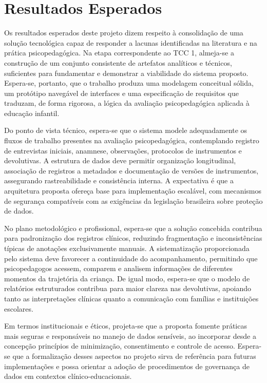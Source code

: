 \chapter[Resultados Esperados]{Resultados Esperados}\label{capitulo6}

Os resultados esperados deste projeto dizem respeito à consolidação de uma solução tecnológica capaz de responder a lacunas identificadas na literatura e na prática psicopedagógica. Na etapa correspondente ao TCC 1, almeja-se a construção de um conjunto consistente de artefatos analíticos e técnicos, suficientes para fundamentar e demonstrar a viabilidade do sistema proposto. Espera-se, portanto, que o trabalho produza uma modelagem conceitual sólida, um protótipo navegável de interfaces e uma especificação de requisitos que traduzam, de forma rigorosa, a lógica da avaliação psicopedagógica aplicada à educação infantil.

Do ponto de vista técnico, espera-se que o sistema modele adequadamente os fluxos de trabalho presentes na avaliação psicopedagógica, contemplando registro de entrevistas iniciais, anamnese, observações, protocolos de instrumentos e devolutivas. A estrutura de dados deve permitir organização longitudinal, associação de registros a metadados e documentação de versões de instrumentos, assegurando rastreabilidade e consistência interna. A expectativa é que a arquitetura proposta ofereça base para implementação escalável, com mecanismos de segurança compatíveis com as exigências da legislação brasileira sobre proteção de dados.

No plano metodológico e profissional, espera-se que a solução concebida contribua para padronização dos registros clínicos, reduzindo fragmentação e inconsistências típicas de anotações exclusivamente manuais. A sistematização proporcionada pelo sistema deve favorecer a continuidade do acompanhamento, permitindo que psicopedagogos acessem, comparem e analisem informações de diferentes momentos da trajetória da criança. De igual modo, espera-se que o modelo de relatórios estruturados contribua para maior clareza nas devolutivas, apoiando tanto as interpretações clínicas quanto a comunicação com famílias e instituições escolares.

Em termos institucionais e éticos, projeta-se que a proposta fomente práticas mais seguras e responsáveis no manejo de dados sensíveis, ao incorporar desde a concepção princípios de minimização, consentimento e controle de acesso. Espera-se que a formalização desses aspectos no projeto sirva de referência para futuras implementações e possa orientar a adoção de procedimentos de governança de dados em contextos clínico-educacionais.

